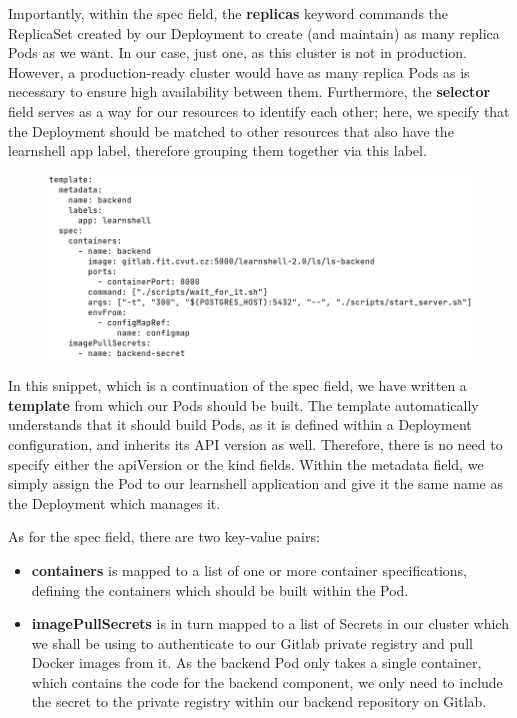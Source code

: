 \documentclass[thesis=B,english]{FITthesis}[2019/12/23]
\begin{document}
Importantly, within the spec field, the \textbf{replicas} keyword commands the ReplicaSet created by our Deployment to create (and maintain) as many replica Pods as we want. In our case, just one, as this cluster is not in production. However, a production-ready cluster would have as many replica Pods as is necessary to ensure high availability between them. Furthermore, the \textbf{selector} field serves as a way for our resources to identify each other; here, we specify that the Deployment should be matched to other resources that also have the learnshell app label, therefore grouping them together via this label.

\begin{figure}[H]
\centering
\hspace*{-0.5cm}
\includegraphics[scale=0.5]{deploy-backend2}
\end{figure}

In this snippet, which is a continuation of the spec field, we have written a \textbf{template} from which our Pods should be built. The template automatically understands that it should build Pods, as it is defined within a Deployment configuration, and inherits its API version as well. Therefore, there is no need to specify either the apiVersion or the kind fields. Within the metadata field, we simply assign the Pod to our learnshell application and give it the same name as the Deployment which manages it.

As for the spec field, there are two key-value pairs: 

\begin{itemize}
  \setlength\itemsep{0em}
  \item \textbf{containers} is mapped to a list of one or more container specifications, defining the containers which should be built within the Pod.
  \item \textbf{imagePullSecrets} is in turn mapped to a list of Secrets in our cluster which we shall be using to authenticate to our Gitlab private registry and pull Docker images from it. As the backend Pod only takes a single container, which contains the code for the backend component, we only need to include the secret to the private registry within our backend repository on Gitlab.
\end{itemize}
\end{document}
